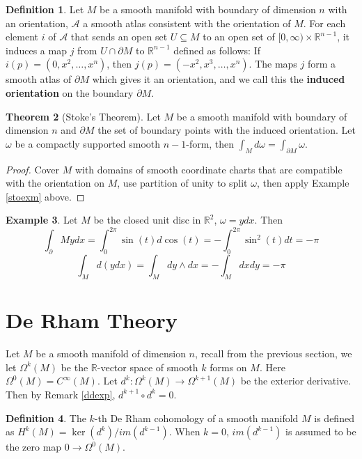 \documentclass{article}
\theoremstyle{definition}
\newtheorem{thm}{Theorem}[section]
\newtheorem{dfn}[thm]{Definition}
\newtheorem{exm}[thm]{Example}
\begin{document}
\begin{dfn}
    Let $M$ be a smooth manifold with boundary of dimension $n$ with an orientation, $\mathcal{A}$ a smooth atlas consistent with the orientation of $M$. For each element $i$ of $\mathcal{A}$ that sends an open set  $U\subseteq M$ to an open set of $[0, \infty)\times\mathbb{R}^{n-1}$, it induces a map $j$ from $U\cap\partial M$ to $\mathbb{R}^{n-1}$ defined as follows:
    If $i(p)=(0, x^2, \dots, x^n)$, then $j(p)=(-x^2, x^3, \dots, x^n)$.
    The maps $j$ form a smooth atlas of $\partial M$ which gives it an orientation, and we call this the {\bf induced orientation} on the boundary $\partial M$.
\end{dfn}

\begin{thm}[Stoke's Theorem]
    Let $M$ be a smooth manifold with boundary of dimension $n$ and $\partial M$ the set of boundary points with the induced orientation. Let $\omega$ be a compactly supported smooth $n-1$-form, then $\int_M d\omega=\int_{\partial M}\omega$.
\end{thm}

\begin{proof}
    Cover $M$ with domains of smooth coordinate charts that are compatible with the orientation on $M$, use partition of unity to split $\omega$, then apply Example \ref{stoexm} above.
\end{proof}

\begin{exm}
    Let $M$ be the closed unit disc in $\mathbb{R}^2$, $\omega=ydx$. Then \[\int_\partial M ydx=\int_0^{2\pi} \sin(t)d\cos(t)=-\int_0^{2\pi}\sin^2(t)dt=-\pi\]
    \[\int_M d(ydx)=\int_M dy\wedge dx=-\int_M dxdy=-\pi\]
\end{exm}

\newpage

\section{De Rham Theory}
    Let $M$ be a smooth manifold of dimension $n$, recall from the previous section, we let $\Omega^k(M)$ be the $\mathbb{R}$-vector space of smooth $k$ forms on $M$. Here $\Omega^0(M)=C^\infty (M)$. Let $d^k: \Omega^k(M)\rightarrow \Omega^{k+1}(M)$ be the exterior derivative. Then by Remark \ref{ddexp}, $d^{k+1}\circ d^k=0$.

    \begin{dfn}
        The $k$-th {De Rham cohomology} of a smooth manifold $M$ is defined as $H^k(M)=\ker(d^k)/im(d^{k-1})$. When $k=0$, $im(d^{k-1})$ is assumed to be the zero map $0\rightarrow \Omega^0(M)$.    \end{dfn}
\end{document}
